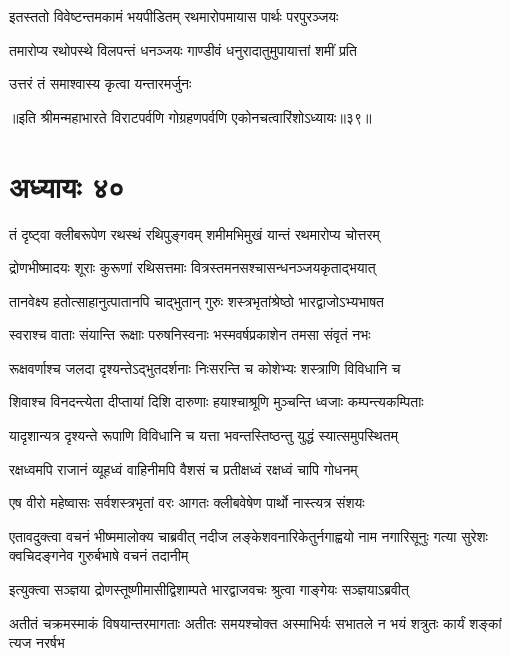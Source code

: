 \twolineshloka
{इतस्ततो विवेष्टन्तमकामं भयपीडितम्}
{रथमारोपमायास पार्थः परपुरञ्जयः}


\twolineshloka
{तमारोप्य रथोपस्थे विलपन्तं धनञ्जयः}
{गाण्डीवं धनुरादातुमुपायात्तां शमीं प्रति}



\onelineshloka
{उत्तरं तं समाश्वास्य कृत्वा यन्तारमर्जुनः}


॥इति श्रीमन्महाभारते विराटपर्वणि गोग्रहणपर्वणि एकोनचत्वारिंशोऽध्यायः॥३९॥

\chapter{अध्यायः ४०}

\twolineshloka
{तं दृष्ट्वा क्लीबरूपेण रथस्थं रथिपुङ्गवम्}
{शमीमभिमुखं यान्तं रथमारोप्य चोत्तरम्}


\twolineshloka
{द्रोणभीष्मादयः शूराः कुरूणां रथिसत्तमाः}
{वित्रस्तमनसश्चासन्धनञ्जयकृताद्भयात्}


\twolineshloka
{तानवेक्ष्य हतोत्साहानुत्पातानपि चाद्भुतान्}
{गुरुः शस्त्रभृतांश्रेष्ठो भारद्वाजोऽभ्यभाषत}


\twolineshloka
{स्वराश्च वाताः संयान्ति रूक्षाः परुषनिस्वनाः}
{भस्मवर्षप्रकाशेन तमसा संवृतं नभः}


\twolineshloka
{रूक्षवर्णाश्च जलदा दृश्यन्तेऽद्भुतदर्शनाः}
{निःसरन्ति च कोशेभ्यः शस्त्राणि विविधानि च}


\twolineshloka
{शिवाश्च विनदन्त्येता दीप्तायां दिशि दारुणाः}
{हयाश्चाश्रूणि मुञ्चन्ति ध्वजाः कम्पन्त्यकम्पिताः}


\twolineshloka
{यादृशान्यत्र दृश्यन्ते रूपाणि विविधानि च}
{यत्ता भवन्तस्तिष्ठन्तु युद्धं स्यात्समुपस्थितम्}


\twolineshloka
{रक्षध्वमपि राजानं व्यूहध्वं वाहिनीमपि}
{वैशसं च प्रतीक्षध्वं रक्षध्वं चापि गोधनम्}


\twolineshloka
{एष वीरो महेष्वासः सर्वशस्त्रभृतां वरः}
{आगतः क्लीबवेषेण पार्थो नास्त्यत्र संशयः}


\onelineshloka
{एतावदुक्त्वा वचनं भीष्ममालोक्य चाब्रवीत्}
\twolineshloka
{नदीज लङ्केशवनारिकेतुर्नगाह्वयो नाम नगारिसूनुः}
{गत्या सुरेशः क्वचिदङ्गनेव गुरुर्बभाषे वचनं तदानीम्}



\twolineshloka
{इत्युक्त्वा सञ्ज्ञया द्रोणस्तूष्णीमासीद्विशाम्पते}
{भारद्वाजवचः श्रुत्वा गाङ्गेयः सञ्ज्ञयाऽब्रवीत्}


\threelineshloka
{अतीतं चक्रमस्माकं विषयान्तरमागताः}
{अतीतः समयश्चोक्त अस्माभिर्यः सभातले}
{न भयं शत्रुतः कार्यं शङ्कां त्यज नरर्षभ}


